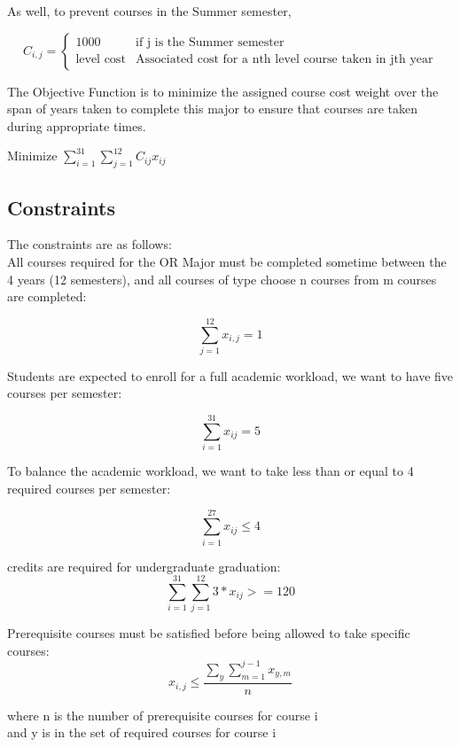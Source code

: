 \documentclass{article}
\begin{document}
\noindent
As well, to prevent courses in the Summer semester, 

\[ C_{i,j} = \begin{cases} 
      1000 & \text{if j is the Summer semester} \\
      \text{level cost} & \text{Associated cost for a nth level course taken in jth year}
   \end{cases}
\]

\noindent
The Objective Function is to minimize the assigned course cost weight over the span of years taken to complete this major to ensure that courses are taken during appropriate times.
\begin{center}
    Minimize $\sum_{i=1}^{31} \sum_{j = 1}^{12} C_{ij} x_{ij} $ 
\end{center}



\subsection{Constraints}

The constraints are as follows:\\

\noindent
All courses required for the OR Major must be completed sometime between the 4 years (12 semesters), and all courses of type choose n courses from m courses are completed:

  $$ \sum_{j=1}^{12} x_{i,j}  = 1$$


\noindent
Students are expected to enroll for a full academic workload, we want to have five courses per semester:
 
$$\sum_{i=1}^{31} x_{ij}  = 5$$

\noindent
To balance the academic workload, we want to take less than or equal to 4 required courses per semester:
 
   $$ \sum_{i=1}^{27} x_{ij}  \leq 4$$


 credits are required for undergraduate graduation:
$$ \sum_{i=1}^{31} \sum_{j=1}^{12} 3 * x_{ij}  >= 120 $$

\noindent
Prerequisite courses must be satisfied before being allowed to take specific courses:
$$ x_{i,j} \leq \frac{{\sum_{y}} \sum_{m =1}^{j-1} x_{y,m}}{n}$$
\begin{center}
    where n is the number of prerequisite courses for course i\\
    and y is in the set of required courses for course i
\end{center}
\end{document}

